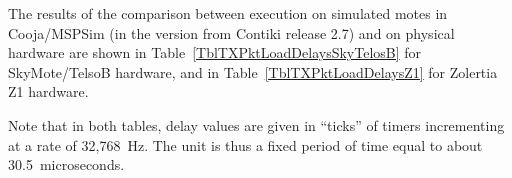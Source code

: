 \documentclass[10pt]{ewsn-proc}
\begin{document}
\medskip

The results of the comparison between execution on simulated motes
in Cooja/MSPSim (in the version from Contiki release 2.7) and on physical
hardware are shown in Table~\ref{TblTXPktLoadDelaysSkyTelosB} for
SkyMote/TelsoB hardware, and in Table~\ref{TblTXPktLoadDelaysZ1} for
Zolertia Z1 hardware.

Note that in both tables, delay values are given in ``ticks'' of timers
incrementing at a rate of 32,768~Hz. The unit is thus a fixed period of
time equal to about 30.5~microseconds.


\newcommand{\tabtitle}[1]{\multicolumn{8}{c}{\bfseries #1}}
\newcommand{\ticks}[1]{#1 ticks}
\newcommand{\moy}[1]{#1}
\newcommand{\ect}[1]{#1}
\newcommand{\estus}[1]{($\approx$ #1 $\mu$sec.)}
\newcommand{\prctv}[1]{$\approx$ #1\% exp. value}
\end{document}

